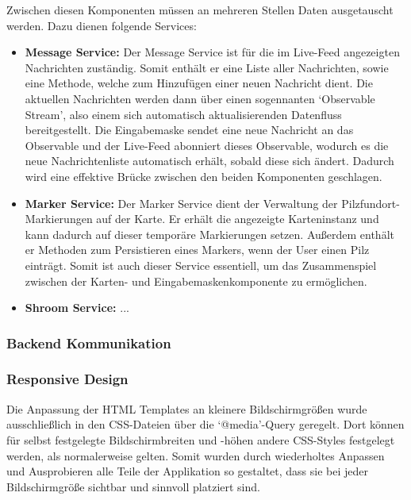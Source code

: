 \documentclass[../main.tex]{subfiles} %
\begin{document}
Zwischen diesen Komponenten müssen an mehreren Stellen Daten ausgetauscht werden. Dazu dienen folgende Services:

\begin{itemize}

	\item \textbf{Message Service:}
	      Der Message Service ist für die im Live-Feed angezeigten Nachrichten zuständig. Somit enthält er eine Liste aller Nachrichten, sowie eine Methode,
	      welche zum Hinzufügen einer neuen Nachricht dient. Die aktuellen Nachrichten werden dann über einen sogennanten `Observable Stream', also einem
	      sich automatisch aktualisierenden Datenfluss bereitgestellt. Die Eingabemaske sendet eine neue Nachricht an das Observable und der Live-Feed
	      abonniert dieses Observable, wodurch es die neue Nachrichtenliste automatisch erhält, sobald diese sich ändert. Dadurch wird eine effektive
	      Brücke zwischen den beiden Komponenten geschlagen.

	\item \textbf{Marker Service:}
	      Der Marker Service dient der Verwaltung der Pilzfundort-Markierungen auf der Karte. Er erhält die angezeigte Karteninstanz und kann dadurch auf
	      dieser temporäre Markierungen setzen. Außerdem enthält er Methoden zum Persistieren eines Markers, wenn der User einen Pilz einträgt. Somit ist
	      auch dieser Service essentiell, um das Zusammenspiel zwischen der Karten- und Eingabemaskenkomponente zu ermöglichen.

	\item \textbf{Shroom Service:} %
	      ...

\end{itemize}

\subsubsection{Backend Kommunikation}  %

\subsubsection{Responsive Design}

Die Anpassung der HTML Templates an kleinere Bildschirmgrößen wurde ausschließlich in den CSS-Dateien über die `@media'-Query geregelt. Dort können für
selbst festgelegte Bildschirmbreiten und -höhen andere CSS-Styles festgelegt werden, als normalerweise gelten. Somit wurden durch wiederholtes Anpassen
und Ausprobieren alle Teile der Applikation so gestaltet, dass sie bei jeder Bildschirmgröße sichtbar und sinnvoll platziert sind.
\end{document}
